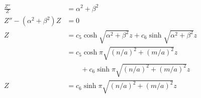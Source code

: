 \documentclass{article}
\begin{document}
\begin{align*}
  \frac{Z''}{Z}                                                                                             & = \alpha^2 + \beta^2                                                            \\
  Z'' - (\alpha^2 + \beta^2) Z                                                                              & = 0                                                                             \\
  Z                                                                                                         & = c_5 \cosh \sqrt{\alpha^2 + \beta^2} z + c_6 \sinh \sqrt{\alpha^2 + \beta^2} z \\
                                                                                                            & = c_5 \cosh \pi \sqrt{(n / a)^2 + (m / a)^2} z                                  \\
                                                                                                            & \qquad + c_6 \sinh \pi \sqrt{(n / a)^2 + (m / a)^2} z                           \\
  Z                                                                                                         & = c_6 \sinh \pi \sqrt{(n / a)^2 + (m / a)^2} z
\end{align*}
\end{document}

